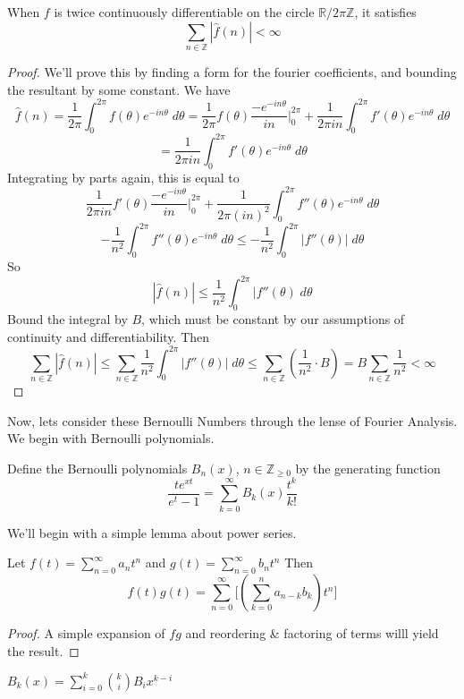 \begin{theorem}
    When $f$ is twice continuously differentiable on the circle $\mathbb{R}/2\pi\mathbb{Z}$, 
    it satisfies \[\sum_{n\in\mathbb{Z}}|\hat{f}(n)|<\infty\]
\end{theorem}

\begin{proof}
    We'll prove this by finding a form for the fourier coefficients, and bounding the resultant 
    by some constant. We have 
    \[
        \hat{f}(n)=\frac{1}{2\pi}\int_0^{2\pi}f(\theta)e^{-in\theta}\;d\theta 
        = \frac{1}{2\pi}f(\theta)\frac{-e^{-in\theta}}{in}\bigg |_0^{2\pi}+\frac{1}{2\pi i n}\int_0^{2\pi}
        f'(\theta)e^{-in\theta}\; d\theta 
    \]
    \[
        =\frac{1}{2\pi i n}\int_0^{2\pi}f'(\theta)e^{-in\theta}\;d\theta
    \]
    Integrating by parts again, this is equal to 
    \[
        \frac{1}{2\pi in}f'(\theta)\frac{-e^{-in\theta}}{in}\bigg |_0^{2\pi}+\frac{1}{2\pi(in)^2}
        \int_0^{2\pi}f''(\theta)e^{-in\theta}\; d\theta 
    \]
    \[ -\frac{1}{n^2}\int_0^{2\pi}f''(\theta)e^{-in\theta}\; d\theta
        \leq -\frac{1}{n^2}\int_0^{2\pi}|f''(\theta)|\;d\theta
    \]
    So \[
        |\hat{f}(n)|\leq \frac{1}{n^2}\int_0^{2\pi}|f''(\theta)\;d\theta
    \]
    Bound the integral by $B$, which must be constant by our assumptions of continuity and differentiability.
    Then 
    \[
        \sum_{n\in\mathbb{Z}}|\hat{f}(n)|\leq \sum_{n\in\mathbb{Z}}\frac{1}{n^2}\int_0^{2\pi}|f''(\theta)|\; 
        d\theta\leq \sum_{n\in\mathbb{Z}}(\frac{1}{n^2}\cdot B)=B\sum_{n\in\mathbb{Z}}\frac{1}{n^2}<\infty
    \]
\end{proof}
Now, lets consider these Bernoulli Numbers through the lense of Fourier Analysis. 
We begin with Bernoulli polynomials.
\begin{definition}
    Define the Bernoulli polynomials $B_n(x)$, $n\in \mathbb{Z}_{\geq 0}$ by the generating function
    \[\frac{te^{xt}}{e^{t}-1}=\sum_{k=0}^{\infty}B_k(x)\frac{t^k}{k!}\]
\end{definition}
We'll begin with a simple lemma about power series.
\begin{lemma}
    Let $f(t)=\sum_{n=0}^{\infty}a_nt^n$ and $g(t)=\sum_{n=0}^{\infty}b_nt^n$
    Then \[f(t)g(t)=\sum_{n=0}^{\infty}\big[(\sum_{k=0}^na_{n-k}b_k)t^n\big]\]
\end{lemma}
\begin{proof}
    A simple expansion of $fg$ and reordering \& factoring of terms willl yield the result.
\end{proof}
\begin{lemma}
    $B_k(x)=\sum_{i=0}^{k}{k\choose i}B_ix^{k-i}$
\end{lemma}
